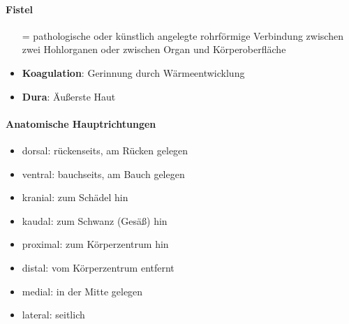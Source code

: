 \paragraph{Fistel}
\begin{itemize}
  \item[=] pathologische oder künstlich angelegte rohrförmige Verbindung zwischen zwei Hohlorganen oder zwischen Organ und Körperoberfläche
  \item \textbf{Koagulation}: Gerinnung durch Wärmeentwicklung
  \item \textbf{Dura}: Äußerste Haut
\end{itemize}

\paragraph{Anatomische Hauptrichtungen}
\begin{itemize}
  \item dorsal: rückenseits, am Rücken gelegen
  \item ventral: bauchseits, am Bauch gelegen
  \item kranial: zum Schädel hin
  \item kaudal: zum Schwanz (Gesäß) hin
  \item proximal: zum Körperzentrum hin
  \item distal: vom Körperzentrum entfernt
  \item medial: in der Mitte gelegen
  \item lateral: seitlich
\end{itemize}